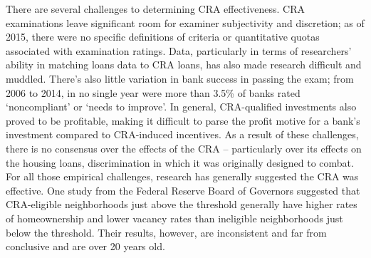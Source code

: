 \documentclass{article}[11pt]
\begin{document}
There are several challenges to determining CRA effectiveness. CRA examinations leave significant room for examiner subjectivity and discretion; as of 2015, there were no specific definitions of criteria or quantitative quotas associated with examination ratings. Data, particularly in terms of researchers' ability in matching loans data to CRA loans, has also made research difficult and muddled. \citep{goodman2020community} There's also little variation in bank success in passing the exam; from 2006 to 2014, in no single year were more than 3.5\% of banks rated `noncompliant' or `needs to improve'. In general, CRA-qualified investments also proved to be  profitable, making it difficult to parse the profit motive for a bank's investment compared to CRA-induced incentives. As a result of these challenges, there is no consensus over the effects of the CRA -- particularly over its effects on the housing loans, discrimination in which it was originally designed to combat. For all those empirical challenges, research has generally suggested the CRA was effective. One study from the Federal Reserve Board of Governors suggested that CRA-eligible neighborhoods just above the threshold generally have higher rates of homeownership and lower vacancy rates than ineligible neighborhoods just below the threshold. \citep{avery2003effects} Their results, however, are inconsistent and far from conclusive and are over 20 years old. 
\end{document}
